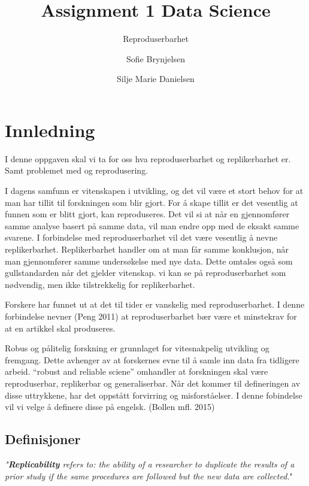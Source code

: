 \documentclass[
  12pt,
  norsk,
]{article}
\title{Assignment 1 Data Science}
\subtitle{Reproduserbarhet}
\author{Sofie Brynjelsen \and Silje Marie Danielsen}
\date{}
\begin{document}
\maketitle

\newpage

\hypertarget{innledning}{%
\section{Innledning}\label{innledning}}

I denne oppgaven skal vi ta for oss hva reproduserbarhet og
replikerbarhet er. Samt problemet med og reprodusering.

I dagens samfunn er vitenskapen i utvikling, og det vil være et stort
behov for at man har tillit til forskningen som blir gjort. For å skape
tillit er det vesentlig at funnen som er blitt gjort, kan reproduseres.
Det vil si at når en gjennomfører samme analyse basert på samme data,
vil man endre opp med de eksakt samme svarene. I forbindelse med
reproduserbarhet vil det være vesentlig å nevne replikerbarhet.
Replikerbarhet handler om at man får samme konklusjon, når man
gjennomfører samme undersøkelse med nye data. Dette omtales også som
gullstandarden når det gjelder vitenskap. vi kan se på reproduserbarhet
som nødvendig, men ikke tilstrekkelig for replikerbarhet.

Forskere har funnet ut at det til tider er vanskelig med
reproduserbarhet. I denne forbindelse nevner (Peng 2011) at
reproduserbarhet bær være et minstekrav for at en artikkel skal
produseres.

Robus og pålitelig forskning er grunnlaget for vitesnakpelig utvikling
og fremgang. Dette avhenger av at forskernes evne til å samle inn data
fra tidligere arbeid. ``robust and reliable sciene'' omhandler at
forskningen skal være reproduserbar, replikerbar og generaliserbar. Når
det kommer til defineringen av disse uttrykkene, har det oppstått
forvirring og misforståelser. I denne fobindelse vil vi velge å definere
disse på engelsk. (Bollen mfl. 2015)

\hypertarget{definisjoner}{%
\subsection{Definisjoner}\label{definisjoner}}

\emph{"\textbf{Replicability} refers to: the ability of a researcher to
duplicate the results of a prior study if the same procedures are
followed but the new data are collected.}"
\end{document}
